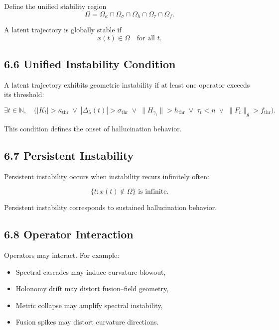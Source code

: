 Define the unified stability region
\[
\Omega
= \Omega_{\kappa}
\cap \Omega_{\sigma}
\cap \Omega_{h}
\cap \Omega_{\tau}
\cap \Omega_{f}.
\]

A latent trajectory is globally stable if
\[
x(t) \in \Omega \quad \text{for all } t.
\]

\subsection*{6.6 Unified Instability Condition}

A latent trajectory exhibits geometric instability if at least one
operator exceeds its threshold:

\[
\exists t \in \mathbb{N}, \quad
\Big(
|K_t| > \kappa_{\mathrm{thr}}
\;\lor\;
|\Delta_\lambda(t)| > \sigma_{\mathrm{thr}}
\;\lor\;
\|H_{\gamma_t}\| > h_{\mathrm{thr}}
\;\lor\;
\tau_t < n
\;\lor\;
\|F_t\|_g > f_{\mathrm{thr}}
\Big).
\]

This condition defines the onset of hallucination behavior.

\subsection*{6.7 Persistent Instability}

Persistent instability occurs when instability recurs infinitely often:

\[
\{ t : x(t) \notin \Omega \} \text{ is infinite}.
\]

Persistent instability corresponds to sustained hallucination behavior.

\subsection*{6.8 Operator Interaction}

Operators may interact. For example:

\begin{itemize}
\item Spectral cascades may induce curvature blowout,
\item Holonomy drift may distort fusion–field geometry,
\item Metric collapse may amplify spectral instability,
\item Fusion spikes may distort curvature directions.
\end{itemize}

